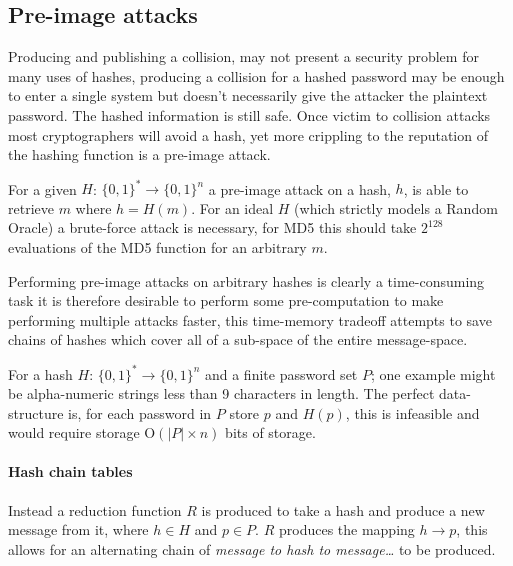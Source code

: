\documentclass[a4paper,12pt]{article}
\begin{document}




\subsection{Pre-image attacks}
Producing and publishing a collision, may not present a security problem for many uses of hashes, producing a collision for a hashed password may be enough to enter a single system but doesn't necessarily give the attacker the plaintext password. The hashed information is still safe. Once victim to collision attacks most cryptographers will avoid a hash\cite{Stevens}, yet more crippling to the reputation of the hashing function is a pre-image attack.

For a given $H$: $\{0,1\}^* \rightarrow \{0,1\}^n$ a pre-image attack on a hash, $h$, is able to retrieve $m$ where $h = H(m)$. For an ideal $H$ (which strictly models a Random Oracle) a brute-force attack is necessary, for MD5 this should take $2^{128}$ evaluations of the MD5 function for an arbitrary $m$.

Performing pre-image attacks on arbitrary hashes is clearly a time-consuming task it is therefore desirable to perform some pre-computation to make performing multiple attacks faster, this time-memory tradeoff attempts to save chains of hashes which cover all of a sub-space of the entire message-space. 

For a hash $H$: $\{0,1\}^* \rightarrow \{0,1\}^n$ and a finite password set $P$; one example might be alpha-numeric strings less than 9 characters in length. The perfect data-structure is, for each password in $P$ store $p$ and $H(p)$, this is infeasible and would require storage $\text{O}(|P| \times n)$ bits of storage.

\paragraph{Hash chain tables}
Instead a reduction function $R$ is produced to take a hash and produce a new message from it, where $h \in H$ and $p \in P$. $R$ produces the mapping $h \rightarrow p$, this allows for an alternating chain of \emph{message to hash to message\dots} to be produced.
\end{document}

